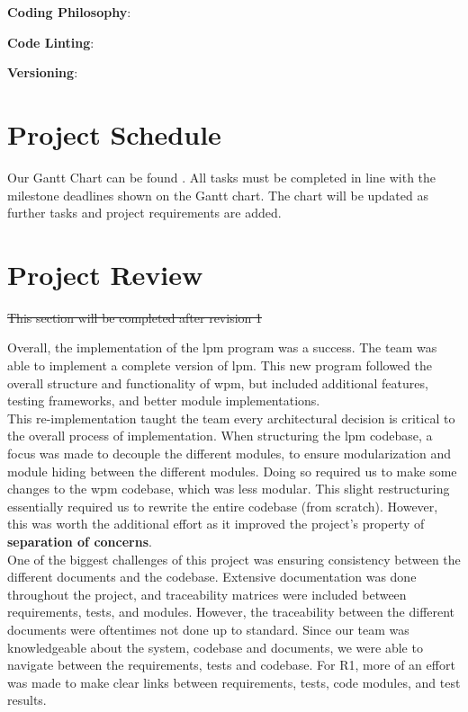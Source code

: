 \documentclass{article}
\begin{document}
\noindent \textbf{Coding Philosophy}: \href{https://www.python.org/dev/peps/pep-0020/}{\color{blue}{The Zen of Python (pep20)}}

\noindent \textbf{Code Linting}: \href{https://www.pylint.org/}{\color{blue}{pylint}}

\noindent \textbf{Versioning}: \href{https://semver.org/}{\color{blue}{Semantic Versioning 2.0}}

\section{Project Schedule}

Our Gantt Chart can be found \href{https://gitlab.cas.mcmaster.ca/modyj/3xa3/-/tree/master/ProjectSchedule}{\color{blue}{here}}. All tasks must be completed in line with the milestone deadlines shown on the Gantt chart. The chart will be updated as further tasks and project requirements are added.

\section{Project Review}

\sout{This section will be completed after revision 1} \\

\color{red}

Overall, the implementation of the lpm program was a success. The team was able to implement a complete version of lpm. This new program followed the overall structure and functionality of wpm, but included additional features, testing frameworks, and better module implementations.\\

This re-implementation taught the team every architectural decision is critical to the overall process of implementation. When structuring the lpm codebase, a focus was made to decouple the different modules, to ensure modularization and module hiding between the different modules. Doing so required us to make some changes to the wpm codebase, which was less modular. This slight restructuring essentially required us to rewrite the entire codebase (from scratch). However, this was worth the additional effort as it improved the project's property of \textbf{separation of concerns}.\\

One of the biggest challenges of this project was ensuring consistency between the different documents and the codebase. Extensive documentation was done throughout the project, and traceability matrices were included between requirements, tests, and modules. However, the traceability between the different documents were oftentimes not done up to standard. Since our team was knowledgeable about the system, codebase and documents, we were able to navigate between the requirements, tests and codebase. For R1, more of an effort was made to make clear links between requirements, tests, code modules, and test results.\\
\end{document}
